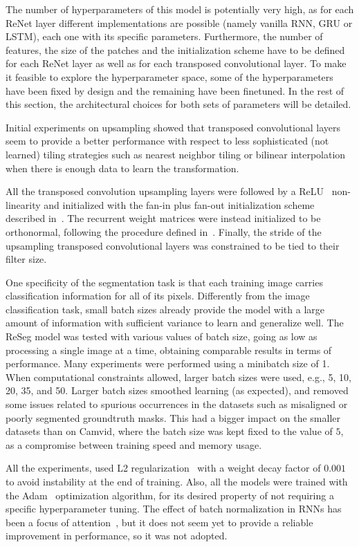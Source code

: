 The number of hyperparameters of this model is potentially very high, as for
each ReNet layer different implementations are possible (namely vanilla RNN,
GRU or LSTM), each one with its specific parameters. Furthermore, the number of
features, the size of the patches and the initialization scheme have to be
defined for each ReNet layer as well as for each transposed convolutional
layer. To make it feasible to explore the hyperparameter space, some of the
hyperparameters have been fixed by design and the remaining have been
finetuned.
In the rest of this section, the architectural choices for both
sets of parameters will be detailed.

Initial experiments on upsampling showed that transposed convolutional layers
seem to provide a better performance with respect to less sophisticated (not
learned) tiling strategies such as nearest neighbor tiling or bilinear
interpolation when there is enough data to learn the transformation.

All the transposed convolution upsampling layers were followed by a
ReLU~\citep{Krizhevsky2012-alexnet} non-linearity and initialized with the
fan-in plus fan-out initialization scheme described
in~\citep{glorot2010understanding}. The recurrent weight matrices were instead
initialized to be orthonormal, following the procedure defined
in~\citep{Saxe2014}. Finally, the stride of the upsampling transposed
convolutional layers was constrained to be tied to their filter size.

One specificity of the segmentation task is that each training image carries
classification information for all of its pixels. Differently from the image
classification task, small batch sizes already provide the model with a large
amount of information with sufficient variance to learn and generalize well.
The ReSeg model was tested with various values of batch size, going as low as
processing a single image at a time, obtaining comparable results in terms of
performance. Many experiments were performed using a minibatch size of 1. When
computational constraints allowed, larger batch sizes were used, e.g., 5, 10,
20, 35, and 50. Larger batch sizes smoothed learning (as expected), and removed
some issues related to spurious occurrences in the datasets such as misaligned
or poorly segmented groundtruth masks. This had a bigger impact on the smaller
datasets than on Camvid, where the batch size was kept fixed to the value of
$5$, as a compromise between training speed and memory usage.

All the experiments, used L2 regularization~\citep{Krogh92asimple} with a
weight decay factor of $0.001$ to avoid instability at the end of training.
Also, all the models were trained with the Adam~\citep{kingma2014adam}
optimization algorithm, for its desired property of not requiring a specific
hyperparameter tuning. The effect of batch normalization in RNNs has been a
focus of attention~\citep{Laurent2015}, but it does not seem yet to provide a
reliable improvement in performance, so it was not adopted.

